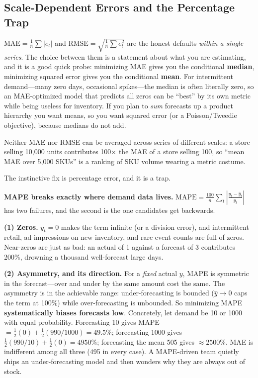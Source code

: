\subsection{Scale-Dependent Errors and the Percentage Trap}

$\text{MAE} = \frac{1}{n}\sum |e_t|$ and $\text{RMSE} = \sqrt{\frac{1}{n}\sum e_t^2}$ are the honest defaults \emph{within a single series}. The choice between them is a statement about what you are estimating, and it is a good quick probe: minimizing MAE gives you the conditional \textbf{median}, minimizing squared error gives you the conditional \textbf{mean}. For intermittent demand---many zero days, occasional spikes---the median is often literally zero, so an MAE-optimized model that predicts all zeros can be ``best'' by its own metric while being useless for inventory. If you plan to \emph{sum} forecasts up a product hierarchy you want means, so you want squared error (or a Poisson/Tweedie objective), because medians do not add.

Neither MAE nor RMSE can be averaged across series of different scales: a store selling 10{,}000 units contributes 100$\times$ the MAE of a store selling 100, so ``mean MAE over 5{,}000 SKUs'' is a ranking of SKU volume wearing a metric costume.

The instinctive fix is percentage error, and it is a trap.

\begin{warningbox}
\textbf{MAPE breaks exactly where demand data lives.} $\text{MAPE} = \frac{100}{n}\sum_t \left|\frac{y_t - \hat{y}_t}{y_t}\right|$ has two failures, and the second is the one candidates get backwards.

\textbf{(1) Zeros.} $y_t = 0$ makes the term infinite (or a division error), and intermittent retail, ad impressions on new inventory, and rare-event counts are full of zeros. Near-zeros are just as bad: an actual of 1 against a forecast of 3 contributes 200\%, drowning a thousand well-forecast large days.

\textbf{(2) Asymmetry, and its direction.} For a \emph{fixed} actual $y$, MAPE is symmetric in the forecast---over and under by the same amount cost the same. The asymmetry is in the achievable range: under-forecasting is bounded ($\hat{y} \to 0$ caps the term at 100\%) while over-forecasting is unbounded. So minimizing MAPE \textbf{systematically biases forecasts low}. Concretely, let demand be 10 or 1000 with equal probability. Forecasting 10 gives MAPE $= \tfrac{1}{2}(0) + \tfrac{1}{2}(990/1000) = 49.5\%$; forecasting 1000 gives $\tfrac{1}{2}(990/10) + \tfrac{1}{2}(0) = 4950\%$; forecasting the mean 505 gives $\approx 2500\%$. MAE is indifferent among all three (495 in every case). A MAPE-driven team quietly ships an under-forecasting model and then wonders why they are always out of stock.
\end{warningbox}

